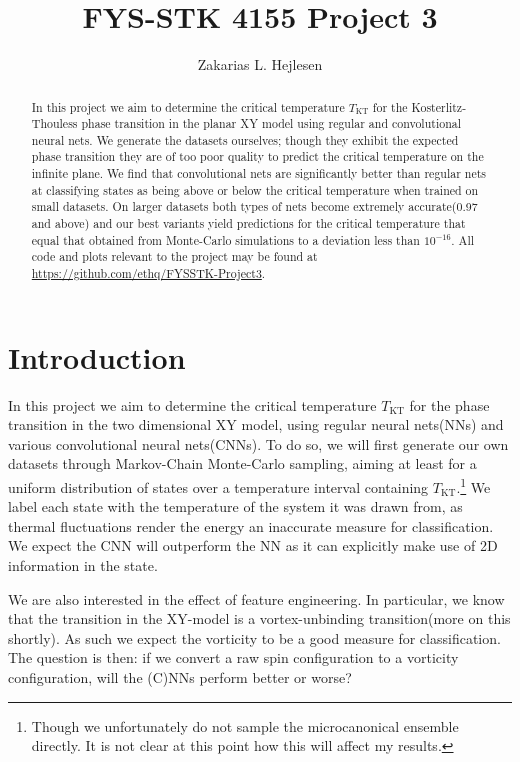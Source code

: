 \documentclass[]{article}
\title{FYS-STK 4155 Project 3}
\author{Zakarias L. Hejlesen}
\begin{document}
\maketitle

\begin{abstract}
	In this project we aim to determine the critical temperature $T_\text{KT}$ for the Kosterlitz-Thouless phase transition in the planar XY model using regular and convolutional neural nets. We generate the datasets ourselves; though they exhibit the expected phase transition they are of too poor quality to predict the critical temperature on the infinite plane. We find that convolutional nets are significantly better than regular nets at classifying states as being above or below the critical temperature when trained on small datasets. On larger datasets both types of nets become extremely accurate(0.97 and above) and our best variants yield predictions for the critical temperature that equal that obtained from Monte-Carlo simulations to a deviation less than $10^{-16}$. All code and plots relevant to the project may be found at \url{https://github.com/ethq/FYSSTK-Project3}.
\end{abstract}

\section{Introduction}
In this project we aim to determine the critical temperature $T_\text{KT}$ for the phase transition in the two dimensional XY model, using regular neural nets(NNs) and various convolutional neural nets(CNNs). To do so, we will first generate our own datasets through Markov-Chain Monte-Carlo sampling, aiming at least for a uniform distribution of states over a temperature interval containing $T_\text{KT}$.\footnote{Though we unfortunately do not sample the microcanonical ensemble directly. It is not clear at this point how this will affect my results.} We label each state with the temperature of the system it was drawn from, as thermal fluctuations render the energy an inaccurate measure for classification. We expect the CNN will outperform the NN as it can explicitly make use of 2D information in the state.

We are also interested in the effect of feature engineering. In particular, we know that the transition in the XY-model is a vortex-unbinding transition(more on this shortly). As such we expect the vorticity to be a good measure for classification. The question is then: if we convert a raw spin configuration to a vorticity configuration, will the (C)NNs perform better or worse?
\end{document}
